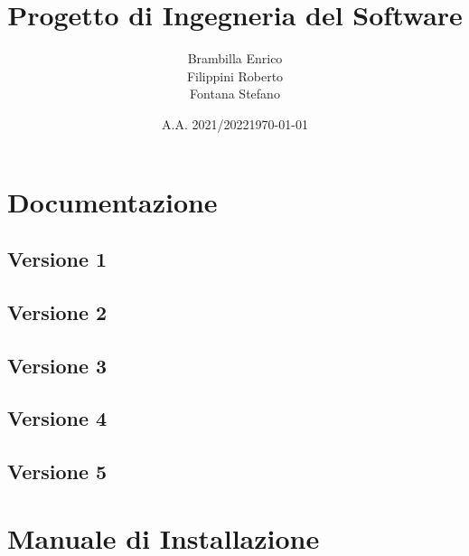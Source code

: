 \documentclass[12pt, a4paper, oneside]{book}
\title{Progetto di Ingegneria del Software}
\author{Brambilla Enrico\\Filippini Roberto\\Fontana Stefano}
\date{A.A. 2021/2022}
\date{\today}
\begin{document}
\maketitle
\cleardoublepage
{}
\tableofcontents
\cleardoublepage






\chapter{Documentazione}
\section{Versione 1}


\pagebreak
\section{Versione 2}


\pagebreak
\section{Versione 3}


\pagebreak
\section{Versione 4}


\pagebreak
\section{Versione 5}


\pagebreak
\chapter{Manuale di Installazione}

\end{document}
